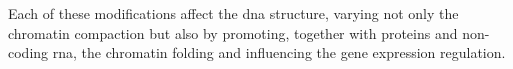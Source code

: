 Each of these modifications affect the \gls{dna} structure, varying not only the chromatin compaction but also by promoting, together with proteins and non-coding \gls{rna}, the chromatin folding and influencing the gene expression regulation.

%

  

